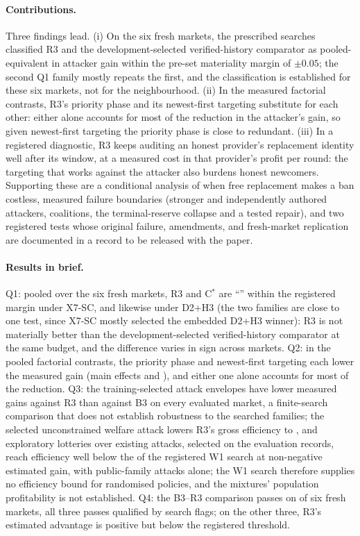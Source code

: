 \documentclass[11pt]{article}
\begin{document}
\paragraph{Contributions.} Three findings lead. (i) On the six fresh markets, the prescribed searches classified R3 and the development-selected verified-history comparator as pooled-equivalent in attacker gain within the pre-set materiality margin of $\pm0.05$; the second Q1 family mostly repeats the first, and the classification is established for these six markets, not for the neighbourhood. (ii) In the measured factorial contrasts, R3's priority phase and its newest-first targeting substitute for each other: either alone accounts for most of the reduction in the attacker's gain, so given newest-first targeting the priority phase is close to redundant. (iii) In a registered diagnostic, R3 keeps auditing an honest provider's replacement identity well after its window, at a measured cost in that provider's profit per round: the targeting that works against the attacker also burdens honest newcomers. Supporting these are a conditional analysis of when free replacement makes a ban costless, measured failure boundaries (stronger and independently authored attackers, coalitions, the terminal-reserve collapse and a tested repair), and two registered tests whose original failure, amendments, and fresh-market replication are documented in a record to be released with the paper.
\paragraph{Results in brief.} Q1: pooled over the six fresh markets, R3 and C$^*$ are ``'' within the registered margin under X7-SC, and likewise under D2+H3 (the two families are close to one test, since X7-SC mostly selected the embedded D2+H3 winner): R3 is not materially better than the development-selected verified-history comparator at the same budget, and the difference varies in sign across markets. Q2: in the pooled factorial contrasts, the priority phase and newest-first targeting each lower the measured gain (main effects  and ), and either one alone accounts for most of the reduction. Q3: the training-selected attack envelopes have lower measured gains against R3 than against B3 on every evaluated market, a finite-search comparison that does not establish robustness to the searched families; the selected unconstrained welfare attack lowers R3's gross efficiency to , and exploratory lotteries over existing attacks, selected on the evaluation records, reach efficiency well below the  of the registered W1 search at non-negative estimated gain, with public-family attacks alone; the W1 search therefore supplies no efficiency bound for randomised policies, and the mixtures' population profitability is not established. Q4: the B3--R3 comparison passes on  of six fresh markets, all three passes qualified by search flags; on the other three, R3's estimated advantage is positive but below the registered threshold.
\end{document}
